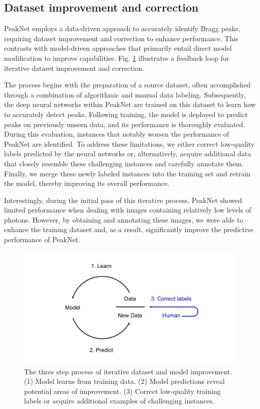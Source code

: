 \documentclass[a4paper]{article}
\newcommand{\peaknet}{PeakNet}
\begin{document}
\subsection{Dataset improvement and correction}

\peaknet{} employs a data-driven approach to accurately identify Bragg peaks, requiring dataset improvement and correction to enhance performance.  This contrasts with model-driven approaches that primarily entail direct model modification to improve capabilities.  Fig. \ref{fig : data engine} illustrates a feedback loop for iterative dataset improvement and correction.  

The process begins with the preparation of a source dataset, often accomplished through a combination of algorithmic and manual data labeling.  Subsequently, the deep neural networks within \peaknet{} are trained on this dataset to learn how to accurately detect peaks.  Following training, the model is deployed to predict peaks on previously unseen data, and its performance is thoroughly evaluated.  During this evaluation, instances that notably worsen the performance of \peaknet{} are identified.  To address these limitations, we either correct low-quality labels predicted by the neural networks or, alternatively, acquire additional data that closely resemble these challenging instances and carefully annotate them.  Finally, we merge these newly labeled instances into the training set and retrain the model, thereby improving its overall performance.  

Interestingly, during the initial pass of this iterative process, \peaknet{} showed limited performance when dealing with images containing relatively low levels of photons.  However, by obtaining and annotating these images, we were able to enhance the training dataset and, as a result, significantly improve the predictive performance of \peaknet{}.


\begin{figure}[!ht]
\centering
\includegraphics[width=\columnwidth,keepaspectratio,trim={1in 0in 1in 0in}]
{./figures/data_engine.pdf}
\caption{The three step process of iterative dataset and model improvement. (1) Model learns from training data. (2) Model predictions reveal potential areas of improvement. (3) Correct low-quality training labels or acquire additional examples of challenging instances.}
\label{fig : data engine}
\end{figure}
\end{document}
